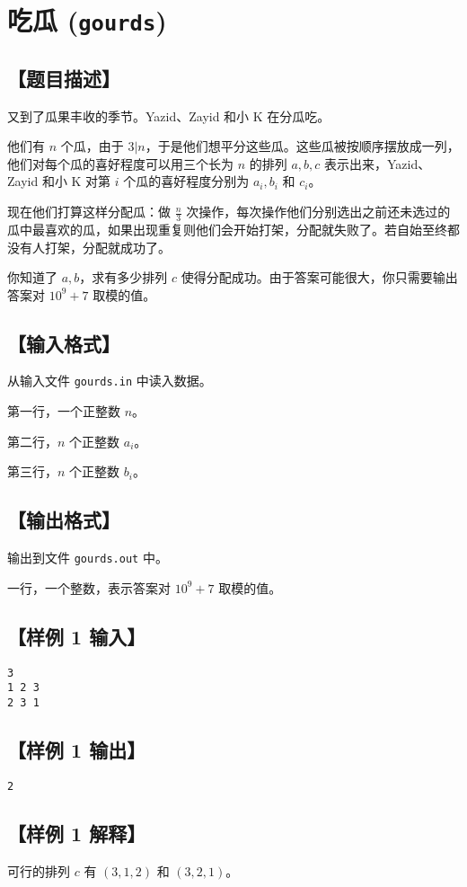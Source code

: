 \documentclass[UTF8]{ctexart}
\begin{document}
	\section*{吃瓜 (\texttt{gourds})}
	\subsection*{【题目描述】}
	又到了瓜果丰收的季节。Yazid、Zayid 和小 K 在分瓜吃。
	
	他们有 $n$ 个瓜，由于 $3|n$，于是他们想平分这些瓜。这些瓜被按顺序摆放成一列，他们对每个瓜的喜好程度可以用三个长为 $n$ 的排列 $a,b,c$ 表示出来，Yazid、Zayid 和小 K 对第 $i$ 个瓜的喜好程度分别为 $a_i,b_i$ 和 $c_i$。
	
	现在他们打算这样分配瓜：做 $\frac n3$ 次操作，每次操作他们分别选出之前还未选过的瓜中最喜欢的瓜，如果出现重复则他们会开始打架，分配就失败了。若自始至终都没有人打架，分配就成功了。
	
	你知道了 $a,b$，求有多少排列 $c$ 使得分配成功。由于答案可能很大，你只需要输出答案对 $10^9+7$ 取模的值。
	\subsection*{【输入格式】}
	从输入文件 \texttt{gourds.in} 中读入数据。
	
	第一行，一个正整数 $n$。
	
	第二行，$n$ 个正整数 $a_i$。
	
	第三行，$n$ 个正整数 $b_i$。
	\subsection*{【输出格式】}
	输出到文件 \texttt{gourds.out} 中。
	
	一行，一个整数，表示答案对 $10^9+7$ 取模的值。
	\subsection*{【样例 1 输入】}
	\begin{lstlisting}
3
1 2 3
2 3 1
	\end{lstlisting}
	\subsection*{【样例 1 输出】}
	\begin{lstlisting}
2
	\end{lstlisting}
	\subsection*{【样例 1 解释】}
	可行的排列 $c$ 有 $(3,1,2)$ 和 $(3,2,1)$。
\end{document}
